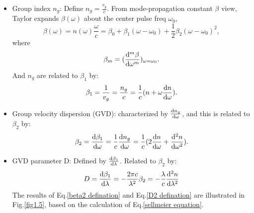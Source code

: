 \documentclass[12pt]{extarticle}
\newcommand{\<}{\langle}
\renewcommand{\>}{\rangle}
\theoremstyle{definition}
\begin{document}
\begin{itemize}
                \item Group index $n_g$: Define $n_g = \frac{v_g}{c}$. From mode-propagation constant $\beta$ view, Taylor expands $\beta(\omega)$ about the center pulse freq $\omega_0$, 
                    \begin{equation}
                        \beta(\omega) = n(\omega)\frac{\omega}{c}=\beta_0 + \beta_1(\omega-\omega_0)+\frac{1}{2}\beta_2(\omega-\omega_0)^2,
                        \label{propagation constant expansion}
                    \end{equation}
                    where
                    \begin{equation}
                        \beta_m = (\dv[m]{\beta}{\omega})_{\omega=\omega_0}.
                    \end{equation}
                    And $n_g$ are related to $\beta_1$ by:
                    \begin{equation}
                        \beta_1 = \frac{1}{v_g} = \frac{n_g}{c} = \frac{1}{c}(n+\omega \dv{n}{\omega}).
                        \label{group velocity and group index}
                    \end{equation}
                
                \item Group velocity dispersion (GVD): characterized by $\dv{n_g}{\omega}$, and this is related to $\beta_2$ by:
                    \begin{equation}
                        \beta_2 = \dv{\beta_1}{\omega} = \frac{1}{c}\dv{n_g}{\omega} = \frac{1}{c}(2\dv{n}{\omega} +\dv[2]{n}{\omega}).
                        \label{beta2 defination}
                    \end{equation}
                    
                \item GVD parameter D: Defined by $\dv{\beta_1}{\lambda}$. Related to $\beta_2$ by:
                    \begin{equation}
                        D = \dv{\beta_1}{\lambda} = -\frac{2\pi c}{\lambda^2}\beta_2 = -\frac{\lambda}{c}\dv[2]{n}{\lambda}
                        \label{D2 defination}
                    \end{equation}
                     The results of Eq.\ref{beta2 defination} and Eq.\ref{D2 defination} are illustrated in Fig.\ref{fig1.5}, based on the calculation of Eq.\ref{sellmeier equation}.
                     

\end{itemize}
\end{document}
